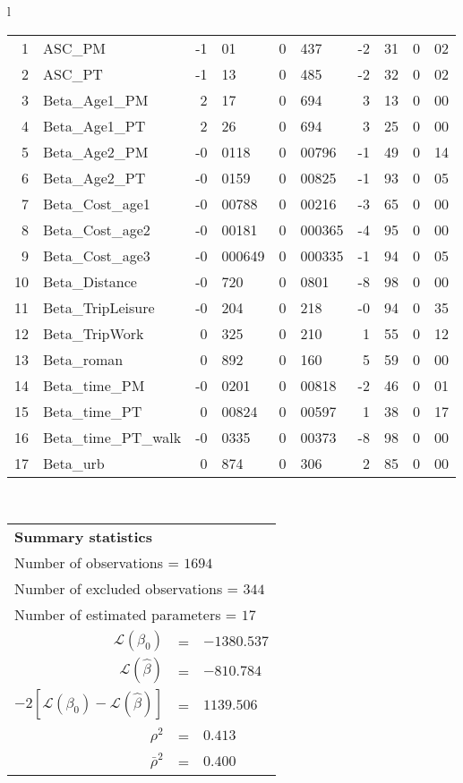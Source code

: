 \begin{tabular}{l}
\begin{tabular}{rlr@{.}lr@{.}lr@{.}lr@{.}l}
1 & ASC_PM  & -1&01 & 0&437 & -2&31 & 0&02\\
2 & ASC_PT & -1&13 & 0&485 & -2&32 & 0&02\\
3 & Beta_Age1_PM & 2&17 & 0&694 & 3&13 & 0&00\\
4 & Beta_Age1_PT & 2&26 & 0&694 & 3&25 & 0&00\\
5 & Beta_Age2_PM & -0&0118 & 0&00796 & -1&49 & 0&14\\
6 & Beta_Age2_PT & -0&0159 & 0&00825 & -1&93 & 0&05\\
7 & Beta_Cost_age1 & -0&00788 & 0&00216 & -3&65 & 0&00\\
8 & Beta_Cost_age2 & -0&00181 & 0&000365 & -4&95 & 0&00\\
9 & Beta_Cost_age3 & -0&000649 & 0&000335 & -1&94 & 0&05\\
10 & Beta_Distance & -0&720 & 0&0801 & -8&98 & 0&00\\
11 & Beta_TripLeisure & -0&204 & 0&218 & -0&94 & 0&35\\
12 & Beta_TripWork & 0&325 & 0&210 & 1&55 & 0&12\\
13 & Beta_roman & 0&892 & 0&160 & 5&59 & 0&00\\
14 & Beta_time_PM & -0&0201 & 0&00818 & -2&46 & 0&01\\
15 & Beta_time_PT & 0&00824 & 0&00597 & 1&38 & 0&17\\
16 & Beta_time_PT_walk & -0&0335 & 0&00373 & -8&98 & 0&00\\
17 & Beta_urb & 0&874 & 0&306 & 2&85 & 0&00\\
\hline
\end{tabular}
\\
\begin{tabular}{rcl}
\multicolumn{3}{l}{\bf Summary statistics}\\
\multicolumn{3}{l}{ Number of observations = $1694$} \\
\multicolumn{3}{l}{ Number of excluded observations = $344$} \\
\multicolumn{3}{l}{ Number of estimated  parameters = $17$} \\
 $\mathcal{L}(\beta_0)$ &=&  $-1380.537$ \\
 $\mathcal{L}(\hat{\beta})$ &=& $-810.784 $  \\
 $-2[\mathcal{L}(\beta_0) -\mathcal{L}(\hat{\beta})]$ &=& $1139.506$ \\
    $\rho^2$ &=&   $0.413$ \\
    $\bar{\rho}^2$ &=&    $0.400$ \\
\end{tabular}
  \end{tabular}
